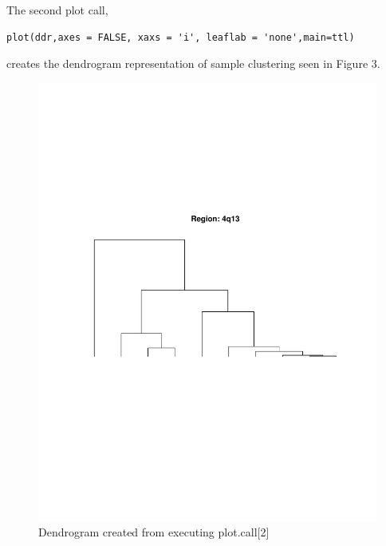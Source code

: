 \documentclass[]{article}
\begin{document}
The second plot call, 
\begin{verbatim}
plot(ddr,axes = FALSE, xaxs = 'i', leaflab = 'none',main=ttl)
\end{verbatim}
creates the dendrogram representation of sample clustering seen in Figure 3. 
\begin{center}
\begin{figure}
\includegraphics{dendro}
\caption{Dendrogram created from executing plot.call[2]}
\end{figure}
\end{center}
\end{document}

